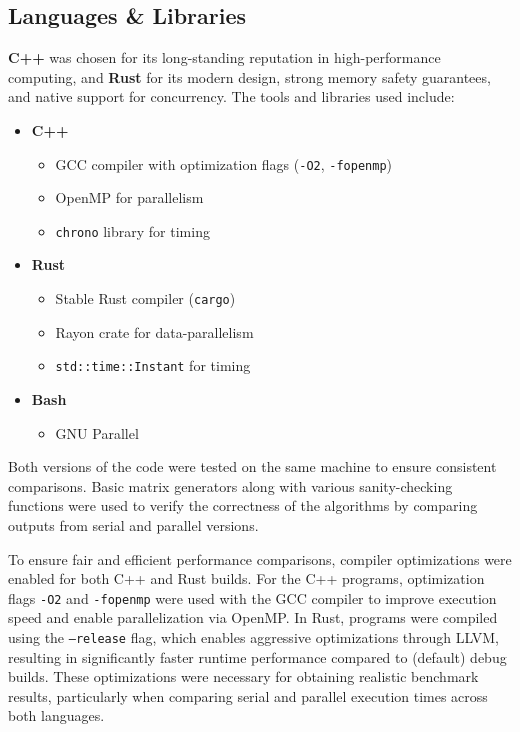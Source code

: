 \documentclass[12pt]{article}
\begin{document}
\subsection*{Languages \& Libraries}

\textbf{C++} was chosen for its long-standing reputation in high-performance computing, and \textbf{Rust} for its modern design, strong memory safety guarantees,
and native support for concurrency. The tools and libraries used include:

\begin{itemize}
    \item \textbf{C++}
          \begin{itemize}
              \item GCC compiler with optimization flags (\texttt{-O2}, \texttt{-fopenmp})
              \item OpenMP for parallelism
              \item \texttt{chrono} library for timing
          \end{itemize}

    \item \textbf{Rust}
          \begin{itemize}
              \item Stable Rust compiler (\texttt{cargo})
              \item Rayon crate for data-parallelism
              \item \texttt{std::time::Instant} for timing
          \end{itemize}
    \item \textbf{Bash}
          \begin{itemize}
              \item GNU Parallel
          \end{itemize}
\end{itemize}

Both versions of the code were tested on the same machine to ensure consistent comparisons. Basic matrix generators along with various
sanity-checking functions were used to verify the correctness of the algorithms by comparing outputs from serial and parallel versions.

To ensure fair and efficient performance comparisons, compiler optimizations were enabled for both C++ and Rust builds. For the C++ programs,
optimization flags  \texttt{-O2} and \texttt{-fopenmp} were used with the GCC compiler to improve execution speed and enable parallelization via OpenMP.
In Rust, programs were compiled using the \texttt{--release} flag, which enables aggressive optimizations through LLVM, resulting in significantly faster
runtime performance compared to (default) debug builds. These optimizations were necessary for obtaining realistic benchmark results, particularly when
comparing serial and parallel execution times across both languages.
\end{document}
